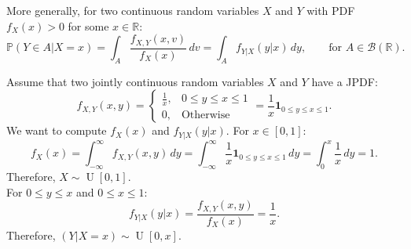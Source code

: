 \documentclass{huhtakm-template-book-v2}
\newcommand{\prob}{\mathbb{P}}
\DeclareMathOperator{\U}{U}
\begin{document}
    \begin{rem}
        More generally, for two continuous random variables $X$ and $Y$ with PDF $f_{X}(x) > 0$ for some $x \in \mathbb{R}$:
        \begin{equation*}
            \prob(Y \in A|X = x) = \int_{A}\frac{f_{X,Y}(x, v)}{f_{X}(x)}\,dv = \int_{A}f_{Y|X}(y|x)\,dy, \qquad\text{for }A \in \mathcal{B}(\mathbb{R}).
        \end{equation*}
    \end{rem}
    \begin{eg}
        \label{Chapter 5 (Example) JPDF to Conditional PDF Example}
        Assume that two jointly continuous random variables $X$ and $Y$ have a JPDF:
        \begin{equation*}
            f_{X,Y}(x, y) = \begin{cases}
                \frac{1}{x}, &0 \leq y \leq x \leq 1\\
                0, &\text{Otherwise}
            \end{cases} = \frac{1}{x}\mathbf{1}_{0 \leq y \leq x \leq 1}.
        \end{equation*}
        We want to compute $f_{X}(x)$ and $f_{Y|X}(y|x)$.
        For $x \in [0,1]$:
        \begin{equation*}
            f_{X}(x) = \int_{-\infty}^{\infty} f_{X,Y}(x, y)\,dy = \int_{-\infty}^{\infty}\frac{1}{x}\mathbf{1}_{0 \leq y \leq x \leq 1}\,dy = \int_{0}^{x}\frac{1}{x}\,dy = 1.
        \end{equation*}
        Therefore, $X \sim \U[0,1]$.\\
        For $0 \leq y \leq x$ and $0 \leq x \leq 1$:
        \begin{equation*}
            f_{Y|X}(y|x) = \frac{f_{X,Y}(x, y)}{f_{X}(x)} = \frac{1}{x}.
        \end{equation*}
        Therefore, $(Y|X = x) \sim \U[0,x]$.
    \end{eg}
    \newpage
\end{document}
